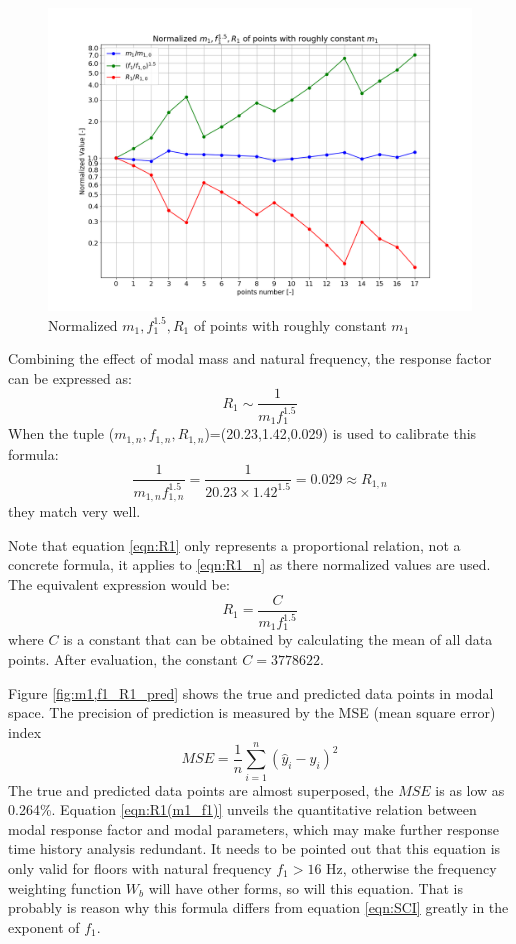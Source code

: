 \begin{figure}[H]
\centering
\includegraphics[width=.8\textwidth]{images/norm_m1_f1_1_5_R1_const_m1.png}
\caption{Normalized $m_1,f_1^{1.5},R_1$ of points with roughly constant $m_1$}
\label{fig:norm_m1_f1_1_5_R1_const_m1}
\end{figure}

Combining the effect of modal mass and natural frequency, the response factor can be expressed as:
\begin{equation}
    R_1\sim \frac{1}{m_1f_1^{1.5}}
\label{eqn:R1}
\end{equation}
When the tuple ($m_{1,n},f_{1,n},R_{1,n}$)=(20.23,1.42,0.029) is used to calibrate this formula:
\begin{equation}
    \frac{1}{m_{1,n}f_{1,n}^{1.5}}=\frac{1}{20.23\times1.42^{1.5}}=0.029\approx R_{1,n}
\label{eqn:R1_n}
\end{equation}
they match very well.

Note that equation \ref{eqn:R1} only represents a proportional relation, not a concrete formula, it applies to \ref{eqn:R1_n} as there normalized values are used. The equivalent expression would be:
\begin{equation}
    R_1= \frac{C}{m_1f_1^{1.5}}
\label{eqn:R1(m1_f1)}
\end{equation}
where $C$ is a constant that can be obtained by calculating the mean of all data points. After evaluation, the constant $C=3778622$. 

Figure \ref{fig:m1,f1_R1_pred} shows the true and predicted data points in modal space. The precision of prediction is measured by the MSE (mean square error) index
\begin{equation}
    MSE=\frac{1}{n}\sum_{i=1}^n(\hat{y}_i-y_i)^2
\end{equation}
\noindent
The true and predicted data points are almost superposed, the $MSE$ is as low as 0.264\%. Equation \ref{eqn:R1(m1_f1)} unveils the quantitative relation between modal response factor and modal parameters, which may make further response time history analysis redundant. It needs to be pointed out that this equation is only valid for floors with natural frequency $f_1>16$ Hz, otherwise the frequency weighting function $W_b$ will have other forms, so will this equation. That is probably is reason why this formula differs from equation \ref{eqn:SCI} greatly in the exponent of $f_1$.


